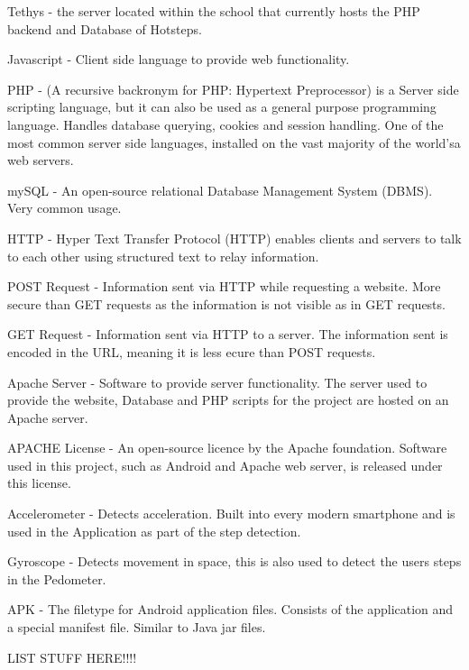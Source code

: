 \documentclass{l4proj}
\begin{document}
Tethys - the server located within the school that currently hosts the PHP backend and Database of Hotsteps.

Javascript - Client side language to provide web functionality.

PHP - (A recursive backronym for PHP: Hypertext Preprocessor) is a Server side scripting language, but it can also be used as a general purpose programming language. Handles database querying, cookies and session handling. One of the most common server side languages, installed on the vast majority of the world'sa web servers.

mySQL - An open-source relational Database Management System (DBMS). Very common usage.

HTTP - Hyper Text Transfer Protocol (HTTP) enables clients and servers to talk to each other using structured text to relay information.

POST Request - Information sent via HTTP while requesting a website. More secure than GET requests as the information is not visible as in GET requests.

GET Request - Information sent via HTTP to a server. The information sent is encoded in the URL, meaning it is less ecure than POST requests.

Apache Server - Software to provide server functionality. The server used to provide the website, Database and PHP scripts for the project are hosted on an Apache server.

APACHE License - An open-source licence by the Apache foundation. Software used in this project, such as Android and Apache web server, is released under this license.

Accelerometer - Detects acceleration. Built into every modern smartphone and is used in the Application as part of the step detection.

Gyroscope - Detects movement in space, this is also used to detect the users steps in the Pedometer.

APK - The filetype for Android application files. Consists of the application and a special manifest file. Similar to Java jar files.

LIST STUFF HERE!!!!
\end{document}
